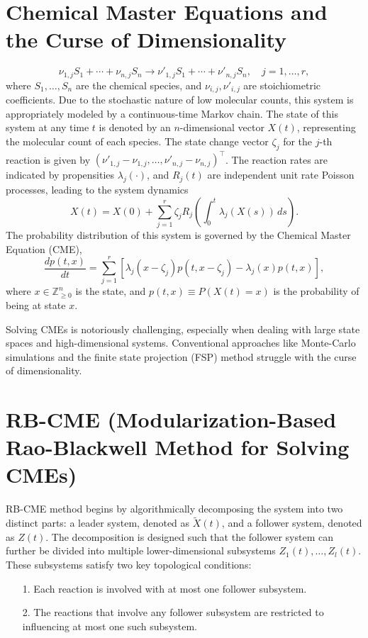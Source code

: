\documentclass[11pt]{isr} %
\begin{document}
\section*{Chemical Master Equations and the Curse of Dimensionality}
\begin{equation}
    \nu_{1,j} S_1 + \cdots + \nu_{n,j} S_n \rightarrow \nu'_{1,j} S_1 + \cdots + \nu'_{n,j} S_n, \quad j = 1, \ldots, r,
\end{equation}
where $S_1, \ldots, S_n$ are the chemical species, and $\nu_{i,j}, \nu'_{i,j}$ are stoichiometric coefficients. Due to the stochastic nature of low molecular counts, this system is appropriately modeled by a continuous-time Markov chain\cite{mcadams}. The state of this system at any time $t$ is denoted by an $n$-dimensional vector $X(t)$, representing the molecular count of each species. The state change vector $\zeta_j$ for the $j$-th reaction is given by $(\nu'_{1,j} - \nu_{1,j}, \ldots, \nu'_{n,j} - \nu_{n,j})^\top$. The reaction rates are indicated by propensities $\lambda_j(\cdot)$, and $R_j(t)$ are independent unit rate Poisson processes, leading to the system dynamics
\begin{equation}
    X(t) = X(0) + \sum_{j=1}^{r} \zeta_j R_j\left( \int_{0}^{t} \lambda_j(X(s)) \, ds \right).
\end{equation}
The probability distribution of this system is governed by the Chemical Master Equation (CME),
\begin{equation}
    \frac{dp(t,x)}{dt} = \sum_{j=1}^{r} \left[ \lambda_j(x - \zeta_j)p(t,x - \zeta_j) - \lambda_j(x)p(t,x) \right],
\end{equation}
where $x \in \mathbb{Z}_{\geq 0}^n$ is the state, and $p(t, x) \equiv P(X(t) = x)$ is the probability of being at state $x$.

Solving CMEs is notoriously challenging, especially when dealing with large state spaces and high-dimensional systems. Conventional approaches like Monte-Carlo simulations and the finite state projection (FSP) method struggle with the curse of dimensionality.


\section*{RB-CME (Modularization-Based Rao-Blackwell Method for Solving CMEs)}
RB-CME method begins by algorithmically decomposing the system into two distinct parts: a leader system, denoted as $\tilde{X}(t)$, and a follower system, denoted as $Z(t)$. The decomposition is designed such that the follower system can further be divided into multiple lower-dimensional subsystems $Z_1(t), \ldots, Z_l(t)$. These subsystems satisfy two key topological conditions:
\begin{itemize}
    \item[1.] Each reaction is involved with at most one follower subsystem.
    \item[2.] The reactions that involve any follower subsystem are restricted to influencing at most one such subsystem.
\end{itemize}
\end{document}
